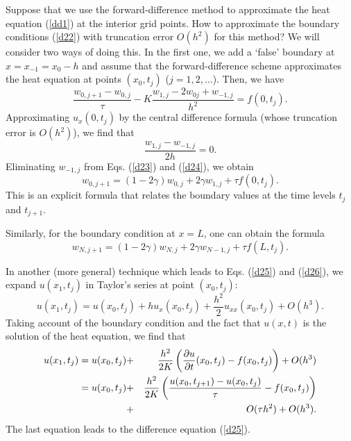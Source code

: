   
 
Suppose that we use the forward-difference method
to approximate the heat equation (\ref{dd1}) at the interior grid points.
How to approximate the boundary conditions (\ref{d22})
with truncation error $O(h^2)$ for this method?
We will consider two ways of doing this.
In the first one, we add a `false' boundary at
$x=x_{-1}=x_{0}-h$ and assume that the forward-difference scheme
approximates the heat equation at points $(x_{0},t_{j})$ ($j=1,2,\dots$). Then,
we have
\begin{equation}
\frac{w_{0,j+1}-w_{0,j}}{\tau}-K
\frac{w_{1, j}-2w_{0j}+w_{-1,j}}{h^{2}}=f(0,t_j). \label{d23}
\end{equation}
Approximating $u_{x}({0},t_{j})$ by the central difference formula
(whose truncation error is $O(h^2)$), we find that
\begin{equation}
\frac{w_{1,j}-w_{-1,j}}{2h}=0. \label{d24}
\end{equation}
Eliminating $w_{-1,j}$ from Eqs. (\ref{d23}) and (\ref{d24}), we obtain
\begin{equation}
w_{0,j+1}=(1-2\gamma)w_{0,j}+2\gamma w_{1,j}+\tau f(0,t_j). \label{d25}
\end{equation}
This is an explicit formula that relates the boundary values at the time levels
$t_{j}$ and $t_{j+1}$.

  
 
Similarly, for the boundary condition at $x=L$, one can obtain the formula
\begin{equation}
w_{N,j+1}=(1-2\gamma)w_{N,j}+2\gamma w_{N-1,j}+\tau f(L,t_j). \label{d26}
\end{equation}

  
 
In another (more general) technique which leads to Eqs. (\ref{d25}) and
(\ref{d26}), we expand $u(x_{1},t_{j})$ in Taylor's series at point
$(x_{0},t_{j})$:
\[
u(x_{1},t_{j})=u(x_{0},t_{j})+h u_{x}(x_0,t_j)+
\frac{h^2}{2}u_{xx}(x_0,t_j)+O(h^3).
\]
Taking account of the boundary condition and the fact that $u(x,t)$ is
the solution of the heat equation, we find that
\begin{eqnarray}
u(x_{1},t_{j})=u(x_{0},t_{j})&+&
\frac{h^2}{2K}\left(\frac{{\partial} u}{{\partial} t}(x_0,t_j)-
f(x_0,t_j)\right)+O(h^3) \nonumber \\
= u(x_{0},t_{j})&+&
\frac{h^2}{2K}\left(\frac{u(x_0,t_{j+1})-u(x_0,t_{j})}{\tau}-
f(x_0,t_j)\right)\nonumber\\
&+&O(\tau h^2)+O(h^3). \nonumber
\end{eqnarray}
The last equation leads to the difference equation (\ref{d25}).
 
